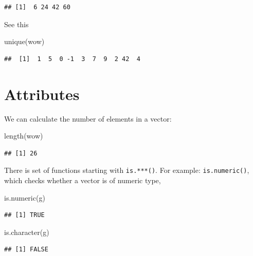 \documentclass[
]{book}
\newenvironment{Shaded}{\begin{snugshade}}{\end{snugshade}}
\newcommand{\FunctionTok}[1]{\textcolor[rgb]{0.00,0.00,0.00}{#1}}
\newcommand{\NormalTok}[1]{#1}
\theoremstyle{definition}
\theoremstyle{definition}
\theoremstyle{definition}
\theoremstyle{definition}
\theoremstyle{remark}
\begin{document}
\begin{verbatim}
## [1]  6 24 42 60
\end{verbatim}

See this

\begin{Shaded}
\begin{Highlighting}[]
\FunctionTok{unique}\NormalTok{(wow)}
\end{Highlighting}
\end{Shaded}

\begin{verbatim}
##  [1]  1  5  0 -1  3  7  9  2 42  4
\end{verbatim}

\hypertarget{attributes}{%
\section{Attributes}\label{attributes}}

We can calculate the number of elements in a vector:

\begin{Shaded}
\begin{Highlighting}[]
\FunctionTok{length}\NormalTok{(wow)}
\end{Highlighting}
\end{Shaded}

\begin{verbatim}
## [1] 26
\end{verbatim}

There is set of functions starting with \texttt{is.***()}. For example: \texttt{is.numeric()}, which checks whether a vector is of numeric type,

\begin{Shaded}
\begin{Highlighting}[]
\FunctionTok{is.numeric}\NormalTok{(g)}
\end{Highlighting}
\end{Shaded}

\begin{verbatim}
## [1] TRUE
\end{verbatim}

\begin{Shaded}
\begin{Highlighting}[]
\FunctionTok{is.character}\NormalTok{(g)}
\end{Highlighting}
\end{Shaded}

\begin{verbatim}
## [1] FALSE
\end{verbatim}
\end{document}
